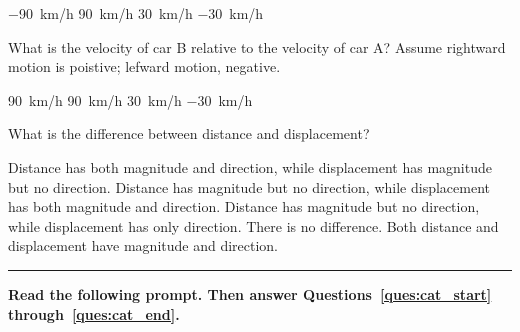 \documentclass[]{exam}
\begin{document}
\begin{questions}
\begin{randomizechoices}
    \correctchoice \SI{-90}{km/h}
    \choice \SI{90}{km/h}
    \choice \SI{30}{km/h}
    \choice \SI{-30}{km/h}
\end{randomizechoices}

\question
What is the velocity of car B relative to the velocity of car A? Assume rightward motion is poistive; lefward motion, negative.

\begin{center}
\end{center}

\begin{randomizechoices}
    \choice \SI{90}{km/h}
    \correctchoice \SI{90}{km/h}
    \choice \SI{30}{km/h}
    \choice \SI{-30}{km/h}
\end{randomizechoices}

\begin{questions}



\question %
What is the difference between distance and displacement?

\begin{choices}
\choice Distance has both magnitude and direction, while displacement has magnitude but no direction.
\CorrectChoice Distance has magnitude but no direction, while displacement has both magnitude and direction.
\choice Distance has magnitude but no direction, while displacement has only direction.
\choice There is no difference. Both distance and displacement have magnitude and direction.
\end{choices}

\vspace{1em} \hrule 

\begin{EnvUplevel}
\textbf{Read the following prompt. Then answer Questions~\ref{ques:cat_start} through~\ref{ques:cat_end}.}


\end{EnvUplevel}
\end{questions}
\end{questions}
\end{document}
